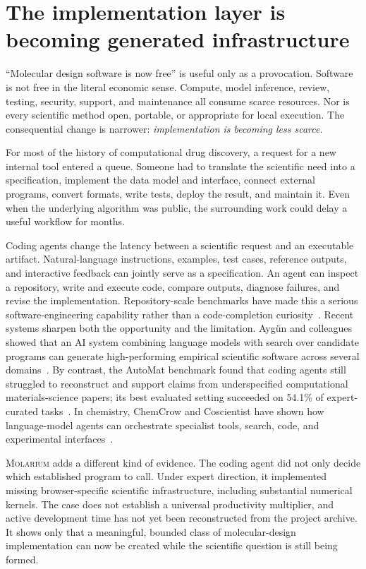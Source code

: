\documentclass[11pt]{article}
\newcommand{\molarium}{\textnormal{\textsc{Molarium}}}
\begin{document}
\section{The implementation layer is becoming generated infrastructure}
\label{sec:generated}

``Molecular design software is now free'' is useful only as a provocation.
Software is not free in the literal economic sense.
Compute, model inference, review, testing, security, support, and maintenance all consume scarce resources.
Nor is every scientific method open, portable, or appropriate for local execution.
The consequential change is narrower: \emph{implementation is becoming less scarce}.

For most of the history of computational drug discovery, a request for a new internal tool entered a queue.
Someone had to translate the scientific need into a specification, implement the data model and interface, connect external programs, convert formats, write tests, deploy the result, and maintain it.
Even when the underlying algorithm was public, the surrounding work could delay a useful workflow for months.

Coding agents change the latency between a scientific request and an executable artifact.
Natural-language instructions, examples, test cases, reference outputs, and interactive feedback can jointly serve as a specification.
An agent can inspect a repository, write and execute code, compare outputs, diagnose failures, and revise the implementation.
Repository-scale benchmarks have made this a serious software-engineering capability rather than a code-completion curiosity~\cite{jimenez2024swebench}.
Recent systems sharpen both the opportunity and the limitation.
Ayg\"un and colleagues showed that an AI system combining language models with search over candidate programs can generate high-performing empirical scientific software across several domains~\cite{aygun2026empirical}.
By contrast, the AutoMat benchmark found that coding agents still struggled to reconstruct and support claims from underspecified computational materials-science papers; its best evaluated setting succeeded on 54.1\% of expert-curated tasks~\cite{huang2026automat}.
In chemistry, ChemCrow and Coscientist have shown how language-model agents can orchestrate specialist tools, search, code, and experimental interfaces~\cite{bran2024chemcrow,boiko2023coscientist}.

\molarium{} adds a different kind of evidence.
The coding agent did not only decide which established program to call.
Under expert direction, it implemented missing browser-specific scientific infrastructure, including substantial numerical kernels.
The case does not establish a universal productivity multiplier, and active development time has not yet been reconstructed from the project archive.
It shows only that a meaningful, bounded class of molecular-design implementation can now be created while the scientific question is still being formed.
\end{document}
